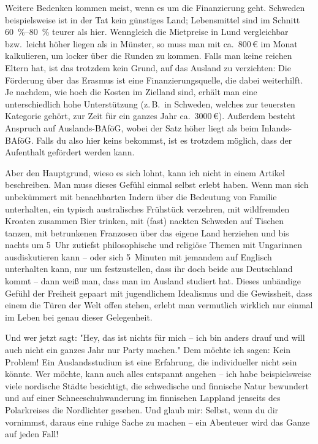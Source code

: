 \begin{multicols}{2}
Weitere Bedenken kommen meist, wenn es um die Finanzierung geht.
Schweden beispielsweise ist in der Tat kein günstiges Land; Lebensmittel sind im Schnitt \SIrange{60}{80}{\percent} teurer als hier.
Wenngleich die Mietpreise in Lund vergleichbar bzw.\ leicht höher liegen als in Münster, so muss man mit ca.~800\,€ im Monat kalkulieren, um locker über die Runden zu kommen.
Falls man keine reichen Eltern hat, ist das trotzdem kein Grund, auf das Ausland zu verzichten:
Die Förderung über das Erasmus ist eine Finanzierungsquelle, die dabei weiterhilft.
Je nachdem, wie hoch die Kosten im Zielland sind, erhält man eine unterschiedlich hohe Unterstützung (z.\,B.\ in Schweden, welches zur teuersten Kategorie gehört, zur Zeit für ein ganzes Jahr ca.~3000\,€).
Außerdem besteht Anspruch auf Auslands-BAföG, wobei der Satz höher liegt als beim Inlands-BAföG.
Falls du also hier keins bekommst, ist es trotzdem möglich, dass der Aufenthalt gefördert werden kann.

Aber den Hauptgrund, wieso es sich lohnt, kann ich nicht in einem Artikel beschreiben.
Man muss dieses Gefühl einmal selbst erlebt haben.
Wenn man sich unbekümmert mit benachbarten Indern über die Bedeutung von Familie unterhalten, ein typisch australisches Frühstück verzehren, mit wildfremden Kroaten zusammen Bier trinken, mit (fast) nackten Schweden auf Tischen tanzen, mit betrunkenen Franzosen über das eigene Land herziehen und bis nachts um 5~Uhr zutiefst philosophische und religiöse Themen mit Ungarinnen ausdiskutieren kann – oder sich 5~Minuten mit jemandem auf Englisch unterhalten kann, nur um festzustellen, dass ihr doch beide aus Deutschland kommt – dann weiß man, dass man im Ausland studiert hat.
Dieses unbändige Gefühl der Freiheit gepaart mit jugendlichem Idealismus und die Gewissheit, dass einem die Türen der Welt offen stehen, erlebt man vermutlich wirklich nur einmal im Leben bei genau dieser Gelegenheit.

Und wer jetzt sagt:
"Hey, das ist nichts für mich – ich bin anders drauf und will auch nicht ein ganzes Jahr nur Party machen."
Dem möchte ich sagen: Kein Problem!
Ein Auslandsstudium ist eine Erfahrung, die individueller nicht sein könnte.
Wer möchte, kann auch alles entspannt angehen – ich habe beispielsweise viele nordische Städte besichtigt, die schwedische und finnische Natur bewundert und auf einer Schneeschuhwanderung im finnischen Lappland jenseits des Polarkreises die Nordlichter gesehen.
Und glaub mir: Selbst, wenn du dir vornimmst, daraus eine ruhige Sache zu machen – ein Abenteuer wird das Ganze auf jeden Fall!


\end{multicols}
